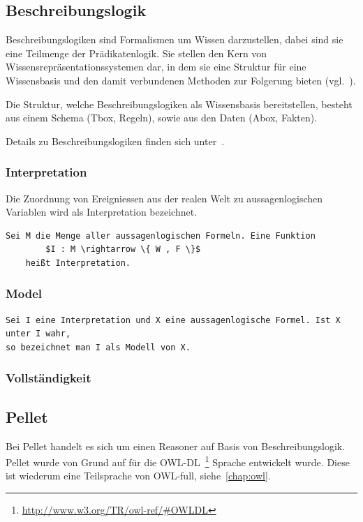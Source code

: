 \subsection{Beschreibungslogik}
\label{subsubsection:beschreibungslogik}
Beschreibungslogiken sind Formalismen um Wissen darzustellen, dabei sind sie eine Teilmenge der Prädikatenlogik. Sie stellen den Kern von Wissensrepräsentationssystemen dar, in dem sie eine Struktur für eine Wissensbasis und den damit verbundenen Methoden zur Folgerung bieten (vgl.~\cite{dl:baader2003}).

Die Struktur, welche Beschreibungslogiken als Wissensbasis bereitstellen, besteht aus einem Schema (Tbox, Regeln), sowie aus den Daten (Abox, Fakten).

Details zu Beschreibungslogiken finden sich unter~\cite{dl:baader2003}.

\subsubsection{Interpretation}
\label{subsubsection:beschreibungslogik_Interpretation}
Die Zuordnung von Ereigniessen aus der realen Welt zu aussagenlogischen Variablen wird als Interpretation bezeichnet. 
\begin{lstlisting}[caption={Definition einer Interpretation \protect\footnotemark}]
	Sei M die Menge aller aussagenlogischen Formeln. Eine Funktion
		$I : M \rightarrow \{ W , F \}$
	heißt Interpretation.
\end{lstlisting}

\subsubsection{Model}
\label{subsubsection:beschreibungslogik_model}
\begin{lstlisting}[caption={Definition einer Model \protect\footnotemark}]
Sei I eine Interpretation und X eine aussagenlogische Formel. Ist X unter I wahr,
so bezeichnet man I als Modell von X.
\end{lstlisting}

\subsubsection{Vollständigkeit}
\label{subsubsection:beschreibungslogik_vollstanendigkeit}


\subsection{Pellet}
\label{subsec:inferenz_pellet}
Bei Pellet handelt es sich um einen Reasoner auf Basis von Beschreibungslogik. Pellet wurde von Grund auf für die OWL-DL~\footnote{\url{http://www.w3.org/TR/owl-ref/\#OWLDL}} Sprache entwickelt wurde. Diese ist wiederum eine Teilsprache von OWL-full, siehe~\autoref{chap:owl}.


